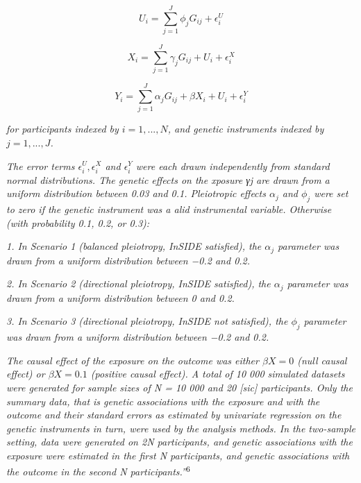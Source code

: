 \documentclass[
]{article}
\begin{document}
\begin{equation}
 U_i = \sum^J_{j=1} \phi_jG_{ij} + \epsilon_i^U
 \end{equation}

\begin{equation}
 X_i = \sum^J_{j=1} \gamma_jG_{ij} + U_i + \epsilon_i^X
 \end{equation}

\begin{equation}
 Y_i = \sum^J_{j=1} \alpha_jG_{ij} + \beta X_i + U_i + \epsilon_i^Y
 \end{equation}

\emph{for participants indexed by \(i = 1, . . . , N\), and genetic instruments indexed by \(j = 1, . . . , J\).}

\emph{The error terms \(\epsilon_i^U , \epsilon_i^X\) and \(\epsilon_i^Y\) were each drawn independently from standard normal distributions. The genetic effects on the xposure γj are drawn from a uniform distribution between 0.03 and 0.1. Pleiotropic effects \(\alpha_j\) and \(\phi_j\) were set to zero if the genetic instrument was a alid instrumental variable. Otherwise (with probability 0.1, 0.2, or 0.3):}

\emph{1. In Scenario 1 (balanced pleiotropy, InSIDE satisfied), the \(\alpha_j\) parameter was drawn from a uniform distribution between −0.2 and 0.2.}

\emph{2. In Scenario 2 (directional pleiotropy, InSIDE satisfied), the \(\alpha_j\) parameter was drawn from a uniform distribution between 0 and 0.2.}

\emph{3. In Scenario 3 (directional pleiotropy, InSIDE not satisfied), the \(\phi_j\) parameter was drawn from a uniform distribution between −0.2 and 0.2.}

\emph{The causal effect of the exposure on the outcome was either \(\beta X = 0\) (null causal effect) or \(\beta X = 0.1\) (positive causal effect). A total of 10 000 simulated datasets were generated for sample sizes of N = 10 000 and 20 {[}sic{]} participants. Only the summary data, that is genetic associations with the exposure and with the outcome and their standard errors as estimated by univariate regression on the genetic instruments in turn, were used by the analysis methods. In the two-sample setting, data were generated on 2N participants, and genetic associations with the exposure were estimated in the first N participants, and genetic associations with the outcome in the second N participants.''}\textsuperscript{6}
\end{document}
